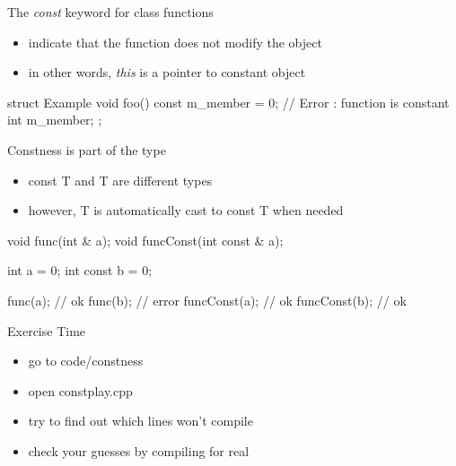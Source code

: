 \begin{frame}[fragile]
  \begin{block}{The {\it const} keyword for class functions}
    \begin{itemize}
    \item indicate that the function does not modify the object
    \item in other words, {\it this} is a pointer to constant object
    \end{itemize}
  \end{block}
  \begin{cppcode}
    struct Example {
      void foo() const  {
        m_member = 0; // Error : function is constant
      }
      int m_member;
    };
  \end{cppcode}
\end{frame}

\begin{frame}[fragile]
  \begin{block}{Constness is part of the type}
    \begin{itemize}
    \item const T and T are different types
    \item however, T is automatically cast to const T when needed
    \end{itemize}
  \end{block}
  \begin{cppcode}
    void func(int & a);
    void funcConst(int const & a);

    int a = 0;
    int const b = 0;

    func(a);      // ok
    func(b);      // error
    funcConst(a); // ok
    funcConst(b); // ok
  \end{cppcode}
\end{frame}

\begin{frame}[fragile]
  \begin{alertblock}{Exercise Time}
    \begin{itemize}
    \item go to code/constness
    \item open constplay.cpp
    \item try to find out which lines won't compile
    \item check your guesses by compiling for real
    \end{itemize}
  \end{alertblock}
\end{frame}

